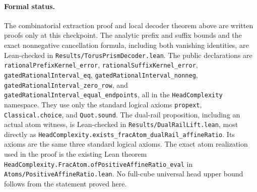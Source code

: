 \documentclass[11pt]{article}
\newcommand{\1}{\mathbf 1}
\begin{document}
\paragraph{Formal status.}
The combinatorial extraction proof and local decoder theorem above are
written proofs only at this checkpoint. The analytic prefix and suffix bounds
and the exact nonnegative cancellation formula, including both vanishing
identities, are Lean-checked in
\texttt{Results/TorusPrismDecoder.lean}. The public declarations are
\texttt{rationalPrefixKernel\_error},
\texttt{rationalSuffixKernel\_error},
\texttt{gatedRationalInterval\_eq},
\texttt{gatedRationalInterval\_nonneg},
\texttt{gatedRationalInterval\_zero\_row}, and
\texttt{gatedRationalInterval\_equal\_endpoints}, all in the
\texttt{HeadComplexity} namespace. They use only the standard logical axioms
\texttt{propext}, \texttt{Classical.choice}, and \texttt{Quot.sound}.
The dual-rail proposition, including an actual atom witness, is Lean-checked
in \texttt{Results/DualRailLift.lean}, most directly as
\texttt{HeadComplexity.exists\_fracAtom\_dualRail\_affineRatio}. Its axioms
are the same three standard logical axioms.
The exact atom realization used in the proof is the existing Lean theorem
\texttt{HeadComplexity.FracAtom.ofPositiveAffineRatio\_eval} in
\texttt{Atoms/PositiveAffineRatio.lean}. No full-cube universal head upper
bound follows from the statement proved here.
\end{document}

